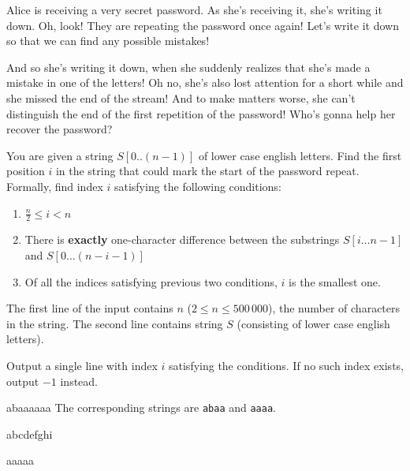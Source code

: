 





Alice is receiving a very secret password. As she's receiving it, she's writing
it down. Oh, look! They are repeating the password once again! Let's write it down
so that we can find any possible mistakes!

And so she's writing it down, when she suddenly realizes that she's made a mistake
in one of the letters! Oh no, she's also lost attention for a short while and she
missed the end of the stream! And to make matters worse, she can't distinguish the
end of the first repetition of the password! Who's gonna help her recover the password?


You are given a string $S[0..(n-1)]$ of lower case english letters. Find the first position $i$ in the
string that could mark the start of the password repeat. Formally, find index $i$ satisfying the following conditions:

\begin{enumerate}
    \item $\frac{n}{2} \leq i < n$
    \item There is \textbf{exactly} one-character difference between the
    substrings $S[i\ldots n-1]$ and $S[0\ldots (n - i - 1)]$
    \item Of all the indices satisfying previous two conditions, $i$ is the
    smallest one.
\end{enumerate}


The first line of the input contains $n$ ($2 \leq n \leq 500\,000$), the number of characters in the string.
The second line contains string $S$ (consisting of lower case english letters).


Output a single line with index $i$ satisfying the conditions. If no such index
exists, output $-1$ instead.



abaaaaaa
\sampleCOMMENT
The corresponding strings are \texttt{abaa} and \texttt{aaaa}.
\sampleEND


\bigskip


abcdefghi
\sampleEND

\bigskip

aaaaa
\sampleEND



